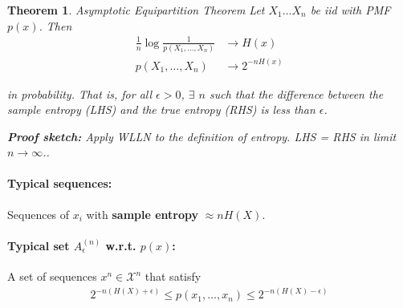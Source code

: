 \documentclass[a4paper,12pt]{report}
\newtheorem{theorem}{Theorem}
\begin{document}
\begin{theorem}{Asymptotic Equipartition Theorem}
Let $X_1 \dots X_n$ be iid with PMF $p(x)$. Then 
\begin{align}
	\label{eqn:aep}
	\frac{1}{n} \log \frac{1}{p(X_1, \dots, X_n)} &\to H(x) \\
	p(X_1, \dots, X_n) &\to 2^{-n H(x)}
\end{align}

in probability. That is, for all $\epsilon > 0$, $\exists$ $n$ such that the
difference between the sample entropy (LHS) and the true entropy (RHS) is less
than $\epsilon$.

\textbf{Proof sketch:} Apply WLLN to the definition of entropy. LHS = RHS in
limit $n\to \infty$..
\end{theorem}


\paragraph{Typical sequences: } Sequences of $x_i$ with \textbf{sample entropy}
$\approx nH(X)$. 

\paragraph{Typical set $A_\epsilon^{(n)}$ w.r.t. $p(x)$: } A set of sequences
$x^n\in \mathcal X^n$ that satisfy 
\begin{align}
	\label{eqn:typical_set}
	2^{-n(H(X) + \epsilon)} \leq p(x_1, \dots, x_n) \leq 2^{-n(H(X) - \epsilon)}
\end{align}
\end{document}

